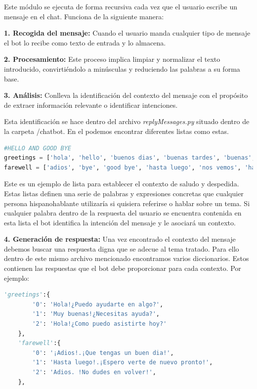 Este módulo se ejecuta de forma recursiva cada vez que el usuario escribe un mensaje en el chat. Funciona de la siguiente manera:\vspace{0.3cm}

\textbf{1. Recogida del mensaje: }Cuando el usuario manda cualquier tipo de mensaje el bot lo recibe como texto de entrada y lo almacena.\vspace{0.3cm}

\textbf{2. Procesamiento: }Este proceso implica limpiar y normalizar el texto introducido, convirtiéndolo a minúsculas y reduciendo las palabras a su forma base. \vspace{0.3cm}

\textbf{3. Análisis: }Conlleva la identificación del contexto del mensaje con el propósito de extraer información relevante o identificar intenciones. 

Esta identificación se hace dentro del archivo \textit{replyMessages.py} situado dentro de la carpeta /chatbot. En el podemos encontrar diferentes listas como estas.\vspace{0.5cm}

\begin{lstlisting}[language=Python]
#HELLO AND GOOD BYE
greetings = ['hola', 'hello', 'buenos dias', 'buenas tardes', 'buenas', 'saludos', 'hi', 'good']
farewell = ['adios', 'bye', 'good bye', 'hasta luego', 'nos vemos', 'hasta pronto', 'buenas noches', 'que tengas un buen dia', 'hasta la proxima','que vaya bien']

\end{lstlisting}

Este es un ejemplo de lista para establecer el contexto de saludo y despedida. Estas listas definen una serie de palabras y expresiones concretas que cualquier persona hispanohablante utilizaría si quisiera referirse o hablar sobre un tema. Si cualquier palabra dentro de la respuesta del usuario se encuentra contenida en esta lista el bot identifica la intención del mensaje y le asociará un contexto.\vspace{0.3cm}

\textbf{4. Generación de respuesta: }Una vez encontrado el contexto del mensaje debemos buscar una respuesta digna que se adecue al tema tratado. Para ello dentro de este mismo archivo mencionado encontramos varios diccionarios. Estos contienen las respuestas que el bot debe proporcionar para cada contexto. Por ejemplo:

\begin{lstlisting}[language=Python]
    'greetings':{
        '0': 'Hola!¿Puedo ayudarte en algo?',
        '1': 'Muy buenas!¿Necesitas ayuda?',
        '2': 'Hola!¿Como puedo asistirte hoy?'
    },
    'farewell':{
        '0': '¡Adios!.¡Que tengas un buen dia!',
        '1': 'Hasta luego!.¡Espero verte de nuevo pronto!',
        '2': 'Adios. !No dudes en volver!',
    },
\end{lstlisting}

